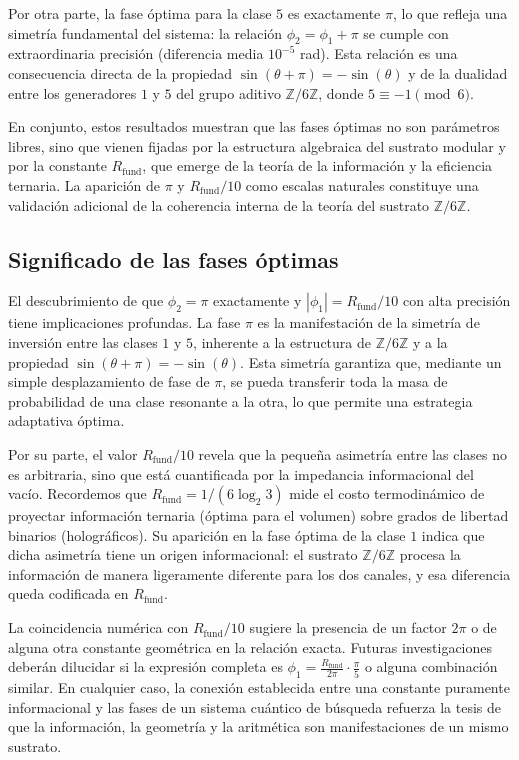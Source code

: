 \documentclass[12pt,a4paper]{article}
\theoremstyle{plain}
\theoremstyle{definition}
\theoremstyle{remark}
\newcommand{\Zmod}{\mathbb{Z}/6\mathbb{Z}}
\newcommand{\Rfund}{R_{\text{fund}}}
\newcommand{\Rfund}{R_{\text{fund}}}
\begin{document}
Por otra parte, la fase óptima para la clase $5$ es exactamente $\pi$, lo que refleja una simetría fundamental del sistema: la relación $\phi_2 = \phi_1 + \pi$ se cumple con extraordinaria precisión (diferencia media $10^{-5}$ rad). Esta relación es una consecuencia directa de la propiedad $\sin(\theta+\pi)=-\sin(\theta)$ y de la dualidad entre los generadores $1$ y $5$ del grupo aditivo $\mathbb{Z}/6\mathbb{Z}$, donde $5\equiv -1 \pmod{6}$.

En conjunto, estos resultados muestran que las fases óptimas no son parámetros libres, sino que vienen fijadas por la estructura algebraica del sustrato modular y por la constante $\Rfund$, que emerge de la teoría de la información y la eficiencia ternaria. La aparición de $\pi$ y $\Rfund/10$ como escalas naturales constituye una validación adicional de la coherencia interna de la teoría del sustrato $\Zmod$.

\subsection*{Significado de las fases óptimas}

El descubrimiento de que $\phi_2 = \pi$ exactamente y $|\phi_1| = \Rfund/10$ con alta precisión tiene implicaciones profundas. La fase $\pi$ es la manifestación de la simetría de inversión entre las clases $1$ y $5$, inherente a la estructura de $\mathbb{Z}/6\mathbb{Z}$ y a la propiedad $\sin(\theta+\pi)=-\sin(\theta)$. Esta simetría garantiza que, mediante un simple desplazamiento de fase de $\pi$, se pueda transferir toda la masa de probabilidad de una clase resonante a la otra, lo que permite una estrategia adaptativa óptima.

Por su parte, el valor $\Rfund/10$ revela que la pequeña asimetría entre las clases no es arbitraria, sino que está cuantificada por la impedancia informacional del vacío. Recordemos que $\Rfund = 1/(6\log_2 3)$ mide el costo termodinámico de proyectar información ternaria (óptima para el volumen) sobre grados de libertad binarios (holográficos). Su aparición en la fase óptima de la clase $1$ indica que dicha asimetría tiene un origen informacional: el sustrato $\Zmod$ procesa la información de manera ligeramente diferente para los dos canales, y esa diferencia queda codificada en $\Rfund$.

La coincidencia numérica con $\Rfund/10$ sugiere la presencia de un factor $2\pi$ o de alguna otra constante geométrica en la relación exacta. Futuras investigaciones deberán dilucidar si la expresión completa es $\phi_1 = \frac{\Rfund}{2\pi}\cdot\frac{\pi}{5}$ o alguna combinación similar. En cualquier caso, la conexión establecida entre una constante puramente informacional y las fases de un sistema cuántico de búsqueda refuerza la tesis de que la información, la geometría y la aritmética son manifestaciones de un mismo sustrato.
\end{document}
